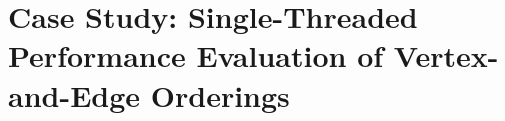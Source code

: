 \chapter{Case Study: Single-Threaded Performance Evaluation of Vertex-and-Edge Orderings}
\label{ch:CaseStudy}